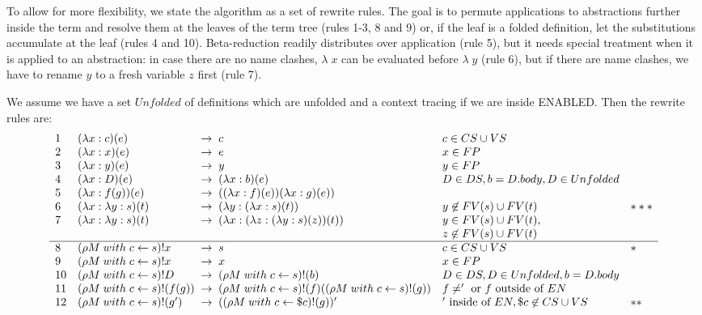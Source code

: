 \documentclass[a4paper]{article}
\begin{document}
To allow for more flexibility, we state the algorithm as a set of rewrite
 rules. The goal is to permute applications to abstractions further inside the
 term and resolve them at the leaves of the term tree (rules 1-3, 8 and 9) or,
 if the leaf is a folded definition, let the substitutions accumulate at the
 leaf (rules 4 and 10). Beta-reduction readily distributes over application
 (rule 5), but it needs special treatment when it is applied to an abstraction:
 in case there are no name clashes, $\lambda\; x$ can be evaluated before
 $\lambda\; y$ (rule 6), but if there are name clashes, we have to rename
 $y$ to a fresh variable $z$ first (rule 7).


We assume we have a set $Unfolded$ of definitions which are unfolded and
 a context tracing if we are inside ENABLED. Then the rewrite rules are:\\

\[
\begin{array}{ll@{\;\;\rightarrow\;\;}lll}
1&  (\lambda x : c)(e) &  c & c \in CS \cup VS & \\
2&  (\lambda x : x)(e) &  e & x \in FP &\\
3&  (\lambda x : y)(e) &  y & y \in FP&\\
4&  (\lambda x : D)(e) &  (\lambda x : b)(e) & D \in DS, b = D.body,
                                             D \in Unfolded&\\
5&  (\lambda x : f(g))(e) & ((\lambda x : f)(e))(\lambda x : g)(e)) &\\
6&  (\lambda x : \lambda y : s)(t)
                     & (\lambda y : (\lambda x : s)(t))
                          & y \not \in FV(s) \cup FV(t) & ***\\
7&  (\lambda x : \lambda y : s)(t)
                     & (\lambda x : (\lambda z : (\lambda y : s)(z))(t))
                          & y \in FV(s) \cup FV(t) , \\
  \multicolumn{3}{l}{} & z \not \in FV(s) \cup FV(t) & \\
  \hline
8&  (\rho M\; with\; c \leftarrow s)! x & s & c \in CS \cup VS & * \\
9&  (\rho M\; with\; c \leftarrow s)! x & x & x \in FP &\\
10&  (\rho M\; with\; c \leftarrow s)!D & (\rho M\; with\; c \leftarrow s)!(b)
                          & D\in DS, D \in Unfolded, b = D.body&\\
11&  (\rho M\; with\; c \leftarrow s)!(f(g))
                     & (\rho M\; with\; c \leftarrow s)!(f)
                       ((\rho M\; with\; c \leftarrow s)!(g) ) & f \neq '\mbox{ or }f\mbox{ outside of }EN  &\\
12&  (\rho M\; with\; c \leftarrow s)!(g')
                     & ((\rho M\; with\; c \leftarrow \$c)!(g) )' & '\mbox{ inside of }EN, \$c \not \in CS\cup VS  &**\\
\end{array}
\]
\end{document}
